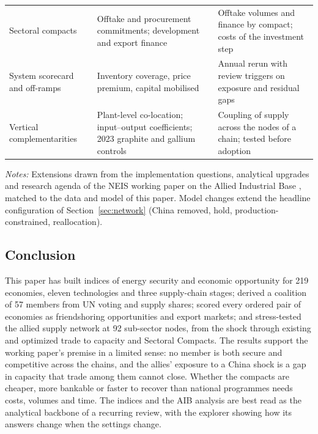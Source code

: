 \begin{table}[htbp]
\begin{threeparttable}
\begin{tabularx}{\textwidth}{@{}>{\raggedright\arraybackslash}p{}
      >{\raggedright\arraybackslash}X >{\raggedright\arraybackslash}X@{}}
    Sectoral compacts & Offtake and procurement commitments; development and export finance & Offtake volumes and finance by compact; costs of the investment step \\
    System scorecard and off-ramps & Inventory coverage, price premium, capital mobilised & Annual rerun with review triggers on exposure and residual gaps \\
    Vertical complementarities & Plant-level co-location; input--output coefficients; 2023 graphite and gallium controls & Coupling of supply across the nodes of a chain; tested before adoption \\
    \bottomrule
  \end{tabularx}
  \begin{tablenotes}[flushleft]\footnotesize
    \item \emph{Notes:} Extensions drawn from the implementation questions, analytical upgrades and research
    agenda of the NEIS working paper on the Allied Industrial Base \citep{neis2026allied}, matched to the
    data and model of this paper. Model changes extend the headline configuration of
    Section~\ref{sec:network} (China removed, hold, production-constrained, reallocation).
  \end{tablenotes}
  \end{threeparttable}
\end{table}

\subsection{Conclusion}\label{subsec:conclusion}

This paper has built indices of energy security and economic opportunity for 219 economies, eleven
technologies and three supply-chain stages; derived a coalition of 57 members from UN voting and
supply shares; scored every ordered pair of economies as friendshoring opportunities and export
markets; and stress-tested the allied supply network at 92 sub-sector nodes, from the shock through
existing and optimized trade to capacity and Sectoral Compacts. The results support the working
paper's premise in a limited sense: no member is both secure and competitive across the chains, and
the allies' exposure to a China shock is a gap in capacity that trade among them cannot close.
Whether the compacts are cheaper, more bankable or faster to recover than national programmes needs
costs, volumes and time. The indices and the AIB analysis are best read as the analytical backbone of
a recurring review, with the explorer showing how its answers change when the settings change.
